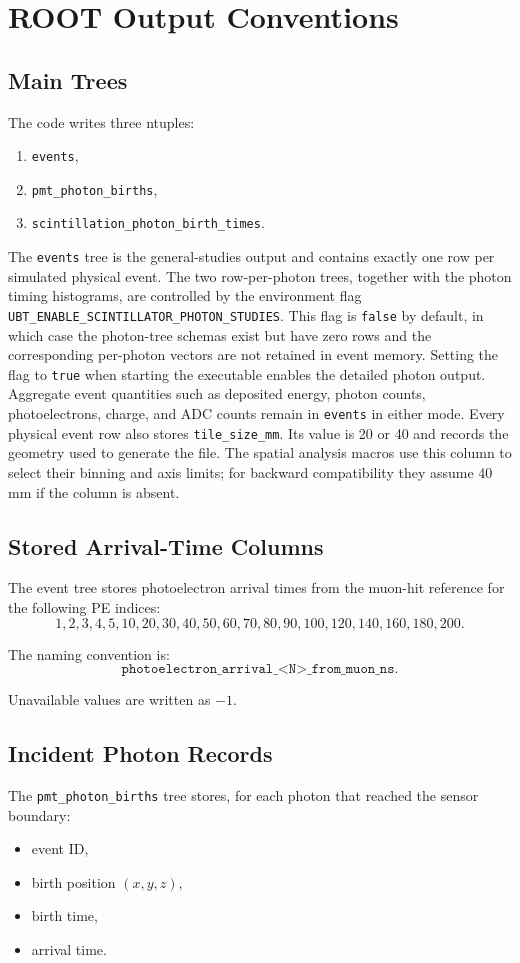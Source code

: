 \section{ROOT Output Conventions}
\begin{technicaldetails}
\subsection{Main Trees}
The code writes three ntuples:
\begin{enumerate}[label=\arabic*.]
\item \texttt{events},
\item \texttt{pmt\_photon\_births},
\item \texttt{scintillation\_photon\_birth\_times}.
\end{enumerate}

The \texttt{events} tree is the general-studies output and contains exactly one
row per simulated physical event.
The two row-per-photon trees, together with the photon timing histograms, are
controlled by the environment flag
\texttt{UBT\_ENABLE\_SCINTILLATOR\_PHOTON\_STUDIES}.  This flag is
\texttt{false} by default, in which case the photon-tree schemas exist but have
zero rows and the corresponding per-photon vectors are not retained in event
memory.  Setting the flag to \texttt{true} when starting the executable enables the
detailed photon output.  Aggregate event quantities such as deposited energy,
photon counts, photoelectrons, charge, and ADC counts remain in
\texttt{events} in either mode.
Every physical event row also stores \texttt{tile\_size\_mm}.  Its
value is 20 or 40 and records the geometry used to generate the file.  The
spatial analysis macros use this column to select their binning and axis
limits; for backward compatibility they assume 40 mm if the column is absent.

\subsection{Stored Arrival-Time Columns}
The event tree stores photoelectron arrival times from the muon-hit reference for the following PE indices:
\[
1, 2, 3, 4, 5, 10, 20, 30, 40, 50, 60, 70, 80, 90, 100, 120, 140, 160, 180, 200.
\]

The naming convention is:
\[
\texttt{photoelectron\_arrival\_<N>\_from\_muon\_ns}.
\]

Unavailable values are written as \(-1\).

\subsection{Incident Photon Records}
The \texttt{pmt\_photon\_births} tree stores, for each photon that reached the sensor boundary:
\begin{itemize}
\item event ID,
\item birth position \((x,y,z)\),
\item birth time,
\item arrival time.
\end{itemize}


\end{technicaldetails}
